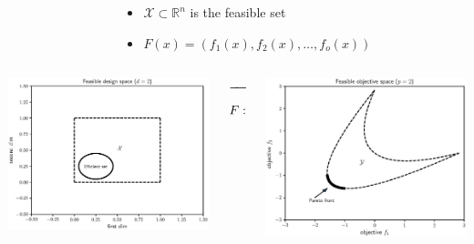 \documentclass[aspectratio=169]{beamer}
\begin{document}
\begin{frame}
\begin{columns}
\begin{column}{0.5\textwidth}
\end{column}
\begin{column}{0.5\textwidth}
\begin{itemize}
\item $\mathcal{X} \subset \mathbb{R}^n$ is the feasible set
\item $F(x) = (f_1(x), f_2(x), \ldots, f_o(x))$
\end{itemize}
\end{column}
\end{columns}
\bigskip
\begin{columns}
\begin{column}{.35\textwidth}
\includegraphics[width=\textwidth]{feasible_design.eps}
\end{column}
\begin{column}{.2\textwidth}
\begin{center}
$\xrightarrow{\hspace*{2cm}}$
$$
F : {\cal X} \rightarrow {\cal Y}
$$
\end{center}
\end{column}
\begin{column}{.35\textwidth}
\includegraphics[width=\textwidth]{convex_pareto.eps}

\end{column}
\end{columns}
\end{frame}
\end{document}
